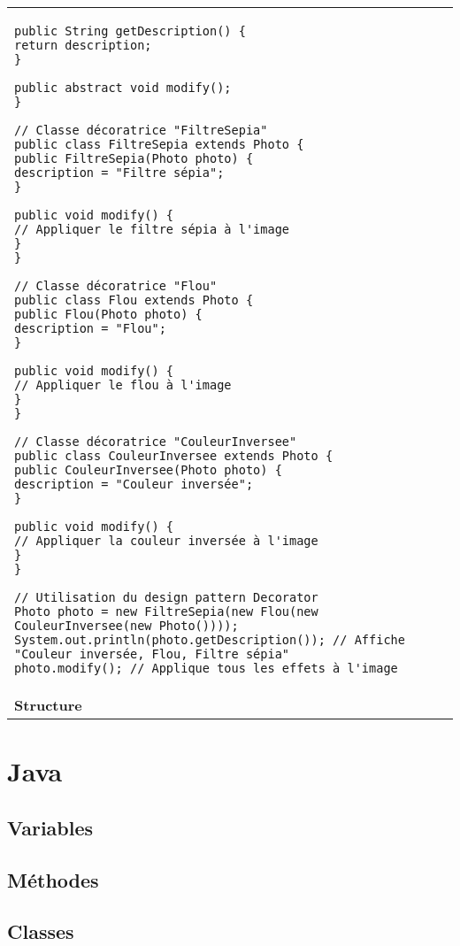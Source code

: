 \begin{table}[H]
\begin{adjustbox}{max width=\textwidth}
\begin{tabular}{l|p{\textwidth}}
\begin{minipage}[tr]{0.5\textwidth}
\begin{minipage}[b]{1\textwidth}
\begin{lstlisting}[style=monstyle]
public String getDescription() {
return description;
}

public abstract void modify();
}

// Classe décoratrice "FiltreSepia"
public class FiltreSepia extends Photo {
public FiltreSepia(Photo photo) {
description = "Filtre sépia";
}

public void modify() {
// Appliquer le filtre sépia à l'image
}
}

// Classe décoratrice "Flou"
public class Flou extends Photo {
public Flou(Photo photo) {
description = "Flou";
}

public void modify() {
// Appliquer le flou à l'image
}
}

// Classe décoratrice "CouleurInversee"
public class CouleurInversee extends Photo {
public CouleurInversee(Photo photo) {
description = "Couleur inversée";
}

public void modify() {
// Appliquer la couleur inversée à l'image
}
}

// Utilisation du design pattern Decorator
Photo photo = new FiltreSepia(new Flou(new CouleurInversee(new Photo())));
System.out.println(photo.getDescription()); // Affiche "Couleur inversée, Flou, Filtre sépia"
photo.modify(); // Applique tous les effets à l'image
\end{lstlisting}
\end{minipage}

\end{minipage}
\\
\cmidrule(lr){1-2}
\textbf{Structure} & 
\\
\bottomrule
\end{tabular}
\end{adjustbox}
\end{table}


\newpage
\section{Java}\label{sec:java}
\subsection{Variables}
\subsection{Méthodes}
\subsection{Classes}
